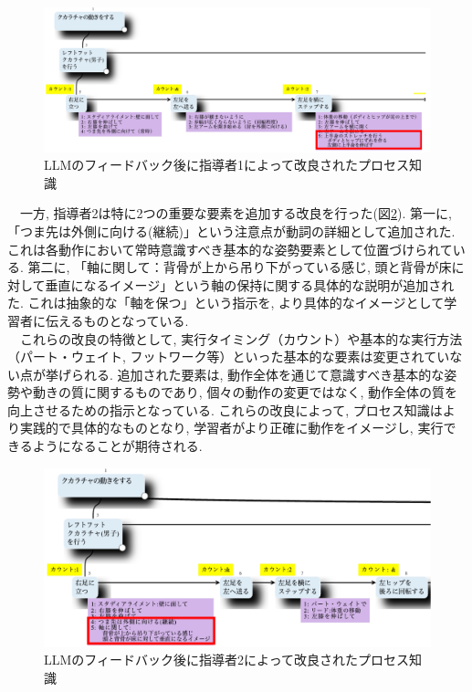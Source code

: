 \begin{figure}[htbp]
    \centering
    \includegraphics[width=1.0\linewidth]{./image/process_knowledge_instructor1_ver2.png}
    \caption{LLMのフィードバック後に指導者1によって改良されたプロセス知識}
    \label{fig:process_knowledge_instructor1_ver2}
\end{figure}

　一方, 指導者2は特に2つの重要な要素を追加する改良を行った(図\ref{fig:process_knowledge_instructor2_ver1}). 第一に, 「つま先は外側に向ける(継続)」という注意点が動詞の詳細として追加された. これは各動作において常時意識すべき基本的な姿勢要素として位置づけられている. 第二に, 「軸に関して：背骨が上から吊り下がっている感じ, 頭と背骨が床に対して垂直になるイメージ」という軸の保持に関する具体的な説明が追加された. これは抽象的な「軸を保つ」という指示を, より具体的なイメージとして学習者に伝えるものとなっている. \\
　これらの改良の特徴として, 実行タイミング（カウント）や基本的な実行方法（パート・ウェイト, フットワーク等）といった基本的な要素は変更されていない点が挙げられる. 追加された要素は, 動作全体を通じて意識すべき基本的な姿勢や動きの質に関するものであり, 個々の動作の変更ではなく, 動作全体の質を向上させるための指示となっている. これらの改良によって, プロセス知識はより実践的で具体的なものとなり, 学習者がより正確に動作をイメージし, 実行できるようになることが期待される. \\

\begin{figure}[htbp]
    \centering
    \includegraphics[width=1.0\linewidth]{./image/process_knowledge_instructor2_ver1.png}
    \caption{LLMのフィードバック後に指導者2によって改良されたプロセス知識}
    \label{fig:process_knowledge_instructor2_ver1}
\end{figure}

